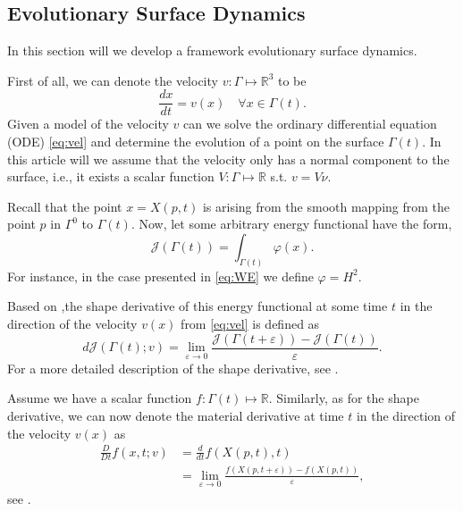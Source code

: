 \subsection{Evolutionary Surface Dynamics}%
\label{sub:evolutionary_equations}

In this section will we develop a framework evolutionary surface dynamics.

First of all, we can denote the velocity $v: \Gamma \mapsto \mathbb{R} ^3$ to be
\begin{equation}
    \label{eq:vel}
\frac{dx }{ d t}  = v\left( x \right) \quad \forall x \in \Gamma \left( t \right) .
\end{equation}
Given a model of the velocity $v$ can we solve the ordinary differential equation (ODE) \eqref{eq:vel} and determine the evolution of a point on the surface $\Gamma\left( t \right)  $. In this article will we assume that the velocity only has a
normal component to the surface, i.e., it exists a scalar function $V: \Gamma \mapsto \mathbb{R} $ s.t. $v = V \nu  $.

Recall that the point $x = X \left( p,t \right)  $ is arising from the smooth mapping from the point $p $ in  $\Gamma ^{0} $ to $\Gamma \left( t \right) $. Now, let some arbitrary energy functional have the form,
\[
\mathcal{J}\left( \Gamma\left( t \right)   \right)  = \int_{\Gamma\left( t \right)  }^{} \varphi \left( x  \right) .
\]
For instance, in the case presented in \eqref{eq:WE} we define $\varphi = H ^2$.

Based on \cite{dougan2012first},the shape derivative of this energy functional at some time $t$ in the direction of the velocity $v\left( x \right) $ from \eqref{eq:vel} is defined as \[
d \mathcal{J} \left( \Gamma \left( t \right) ; v  \right) = \lim_{\varepsilon  \to 0} \frac{\mathcal{J}  \left( \Gamma \left( t + \varepsilon  \right) \right)  - \mathcal{J}\left( \Gamma \left( t  \right) \right)      }{\varepsilon }.
\]
For a more detailed description of the shape derivative, see \cite[Definition 2.19]{sokolowski1992introduction}.

Assume we have a scalar function $f: \Gamma\left( t \right)  \mapsto \mathbb{R}  $. Similarly, as for the shape derivative, we can now denote the material derivative at time $t$ in the direction of the velocity $v\left( x \right) $ as
\[
    \begin{split}
\frac{D}{Dt}  f\left( x,t; v \right)  & = \frac{d}{dt} f \left( X \left( p,t \right) , t \right) \\
&= \lim_{\varepsilon \to 0}  \frac{f \left( X \left( p, t + \varepsilon  \right)  \right) - f \left( X \left( p, t  \right)  \right) }{ \varepsilon },
    \end{split}
\]
see \cite[Definition 2.74]{sokolowski1992introduction}.


